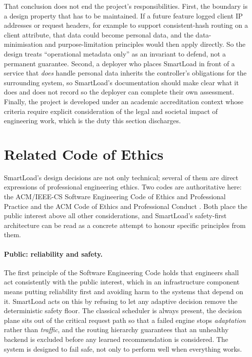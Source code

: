 That conclusion does not end the project's responsibilities. First, the boundary
is a design property that has to be maintained. If a future feature logged client
IP addresses or request headers, for example to support consistent-hash routing
on a client attribute, that data could become personal data, and the
data-minimisation and purpose-limitation principles would then apply directly.
So the design treats ``operational metadata only'' as an invariant to defend,
not a permanent guarantee. Second, a deployer who places SmartLoad in front of a
service that \emph{does} handle personal data inherits the controller's
obligations for the surrounding system, so SmartLoad's documentation should make
clear what it does and does not record so the deployer can complete their own
assessment. Finally, the project is developed under an academic accreditation
context whose criteria \cite{abet2025criteria} require explicit consideration of
the legal and societal impact of engineering work, which is the duty this
section discharges.

\section{Related Code of Ethics}
\label{lit:sec:ethics}

SmartLoad's design decisions are not only technical; several of them are direct
expressions of professional engineering ethics. Two codes are authoritative
here: the ACM/IEEE-CS Software Engineering Code of Ethics and Professional
Practice \cite{gotterbarn1999ethics} and the ACM Code of Ethics and
Professional Conduct \cite{acm2018ethics}. Both place the public interest above
all other considerations, and SmartLoad's safety-first architecture can be read
as a concrete attempt to honour specific principles from them.

\paragraph{Public: reliability and safety.}
The first principle of the Software Engineering Code holds that engineers shall
act consistently with the public interest, which in an infrastructure component
means putting reliability first and avoiding harm to the systems that depend on
it. SmartLoad acts on this by refusing to let any adaptive decision remove the
deterministic safety floor. The classical scheduler is always present, the
decision plane sits out of the critical request path so that a failed engine
stops \emph{adaptation} rather than \emph{traffic}, and the routing hierarchy
guarantees that an unhealthy backend is excluded before any learned
recommendation is considered. The system is designed to fail safe, not only to
perform well when everything works.

